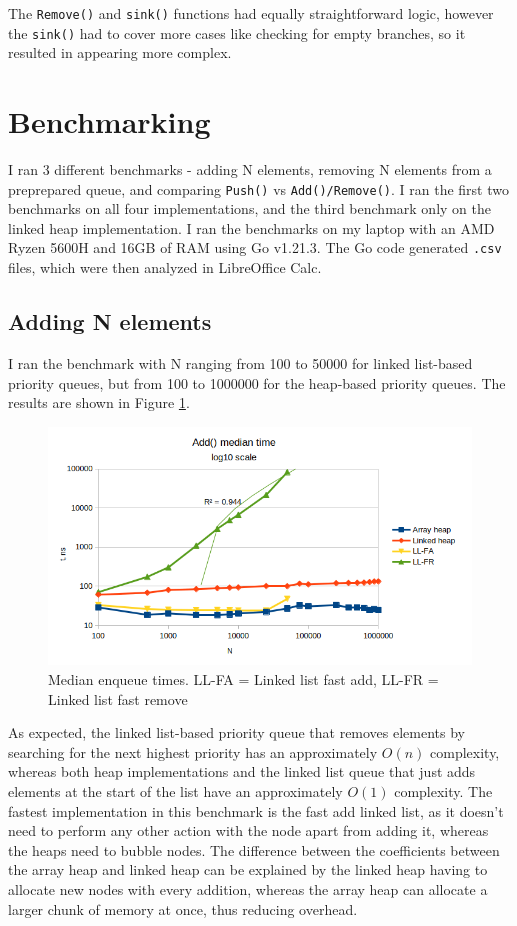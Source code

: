 \documentclass[a4paper,11pt]{article}
\begin{document}
    The \texttt{Remove()} and \texttt{sink()} functions had equally straightforward logic, however the \texttt{sink()} had to cover more cases like checking for empty branches, so it resulted in appearing more complex.

    \section*{Benchmarking}

    I ran 3 different benchmarks - adding N elements, removing N elements from a preprepared queue, and comparing \texttt{Push()} vs \texttt{Add()/Remove()}. I ran the first two benchmarks on all four implementations, and the third benchmark only on the linked heap implementation. I ran the benchmarks on my laptop with an AMD Ryzen 5600H and 16GB of RAM using Go v1.21.3. The Go code generated \texttt{.csv} files, which were then analyzed in LibreOffice Calc.

    \subsection*{Adding N elements}

    I ran the benchmark with N ranging from 100 to 50000 for linked list-based priority queues, but from 100 to 1000000 for the heap-based priority queues. The results are shown in Figure \ref{fig:add}.

    \begin{figure}[H]
        \centering
        \includegraphics[width=\textwidth]{add.png}
        \caption{Median enqueue times. LL-FA = Linked list fast add, LL-FR = Linked list fast remove}
        \label{fig:add}
    \end{figure}

    As expected, the linked list-based priority queue that removes elements by searching for the next highest priority has an approximately $O(n)$ complexity, whereas both heap implementations and the linked list queue that just adds elements at the start of the list have an approximately $O(1)$ complexity. The fastest implementation in this benchmark is the fast add linked list, as it doesn't need to perform any other action with the node apart from adding it, whereas the heaps need to bubble nodes. The difference between the coefficients between the array heap and linked heap can be explained by the linked heap having to allocate new nodes with every addition, whereas the array heap can allocate a larger chunk of memory at once, thus reducing overhead.
\end{document}
